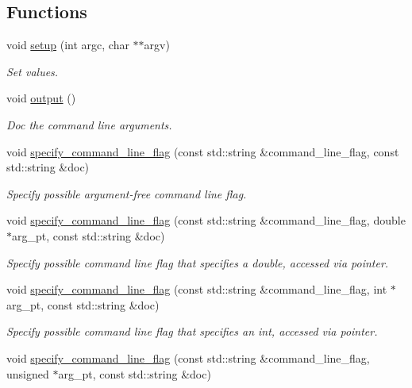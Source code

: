 \subsection*{Functions}
\begin{DoxyCompactItemize}
\item 
void \hyperlink{namespaceoomph_1_1CommandLineArgs_a02666c3d933af7c70da94bb0e87ebeb0}{setup} (int argc, char $\ast$$\ast$argv)
\begin{DoxyCompactList}\small\item\em Set values. \end{DoxyCompactList}\item 
void \hyperlink{namespaceoomph_1_1CommandLineArgs_aca07d359a96b9c7b566142112604ea87}{output} ()
\begin{DoxyCompactList}\small\item\em Doc the command line arguments. \end{DoxyCompactList}\item 
void \hyperlink{namespaceoomph_1_1CommandLineArgs_a4b0153b45b4b4e026b2fe767194d8088}{specify\+\_\+command\+\_\+line\+\_\+flag} (const std\+::string \&command\+\_\+line\+\_\+flag, const std\+::string \&doc)
\begin{DoxyCompactList}\small\item\em Specify possible argument-\/free command line flag. \end{DoxyCompactList}\item 
void \hyperlink{namespaceoomph_1_1CommandLineArgs_a1ddbea55361272d5b057bd76ca9550f0}{specify\+\_\+command\+\_\+line\+\_\+flag} (const std\+::string \&command\+\_\+line\+\_\+flag, double $\ast$arg\+\_\+pt, const std\+::string \&doc)
\begin{DoxyCompactList}\small\item\em Specify possible command line flag that specifies a double, accessed via pointer. \end{DoxyCompactList}\item 
void \hyperlink{namespaceoomph_1_1CommandLineArgs_a4f5c63f51f006503cf75dd6fccaf971c}{specify\+\_\+command\+\_\+line\+\_\+flag} (const std\+::string \&command\+\_\+line\+\_\+flag, int $\ast$arg\+\_\+pt, const std\+::string \&doc)
\begin{DoxyCompactList}\small\item\em Specify possible command line flag that specifies an int, accessed via pointer. \end{DoxyCompactList}\item 
void \hyperlink{namespaceoomph_1_1CommandLineArgs_aa5aa20da06e63203c96ae8c78928d405}{specify\+\_\+command\+\_\+line\+\_\+flag} (const std\+::string \&command\+\_\+line\+\_\+flag, unsigned $\ast$arg\+\_\+pt, const std\+::string \&doc)
$$
\end{DoxyCompactItemize}
